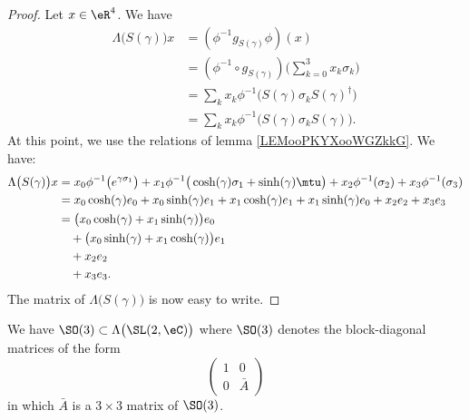 \begin{proof}
    Let \( x\in \eR^4\). We have
    \begin{subequations}
        \begin{align}
            \Lambda\big( S(\gamma) \big)x&=(\phi^{-1}g_{S(\gamma)}\phi)(x)\\
            &=(\phi^{-1}\circ g_{S(\gamma)})\big( \sum_{k=0}^3x_k\sigma_k \big)\\
            &=\sum_kx_k\phi^{-1}\big( S(\gamma)\sigma_kS(\gamma)^{\dag} \big)\\
            &=\sum_kx_k\phi^{-1}\big( S(\gamma)\sigma_kS(\gamma) \big).
        \end{align}
    \end{subequations}
    At this point, we use the relations of lemma \ref{LEMooPKYXooWGZkkG}. We have:
    \begin{subequations}
        \begin{align}
            \Lambda\big( S(\gamma) \big)x&=x_0\phi^{-1}\big(  e^{\gamma\sigma_1} \big)+x_1\phi^{-1}\big( \cosh(\gamma)\sigma_1+\sinh(\gamma)\mtu \big)
            +x_2\phi^{-1}(\sigma_2)+x_3\phi^{-1}(\sigma_3)\\
            &=x_0\cosh(\gamma)e_0+x_0\sinh(\gamma)e_1+x_1\cosh(\gamma)e_1+x_1\sinh(\gamma)e_0+x_2e_2+x_3e_3\\
            &=\big( x_0\cosh(\gamma)+x_1\sinh(\gamma) \big)e_0\\
            &\quad+\big( x_0\sinh(\gamma)+x_1\cosh(\gamma) \big)e_1\\
            &\quad+x_2e_2\\
            &\quad+x_3e_3.
        \end{align}
    \end{subequations}
    The matrix of \( \Lambda\big( S(\gamma) \big)\) is now easy to write.
\end{proof}

\begin{lemma}       \label{LEMooTZPAooWGjMgU}
    We have \( \SO(3)\subset \Lambda\big( \SL(2,\eC) \big)\) where \( \SO(3)\) denotes the block-diagonal matrices of the form
    \begin{equation}
        \begin{pmatrix}
            1    &   0    \\ 
            0    &   \bar A
        \end{pmatrix}
    \end{equation}
    in which \( \bar A\) is a \( 3\times 3\) matrix of \( \SO(3)\).
\end{lemma}

